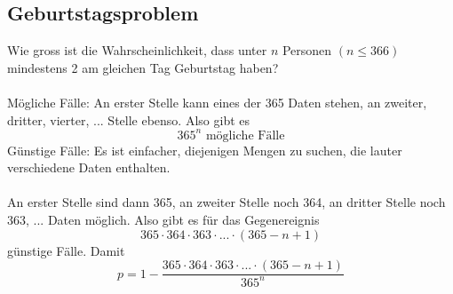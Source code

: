 \documentclass{report}
\begin{document}
\subsection{Geburtstagsproblem}
Wie gross ist die Wahrscheinlichkeit, dass unter $n$ Personen $(n \leq 366)$ mindestens 2 am gleichen Tag Geburtstag haben?\\\\
Mögliche Fälle: An erster Stelle kann eines der 365 Daten stehen, an zweiter, dritter, vierter, ... Stelle ebenso. Also gibt es
\begin{equation}
365^n \mbox{ mögliche Fälle}
\end{equation}
Günstige Fälle: Es ist einfacher, diejenigen Mengen zu suchen, die lauter verschiedene Daten enthalten.\\\\
An erster Stelle sind dann 365, an zweiter Stelle noch 364, an dritter Stelle noch 363, ... Daten möglich. Also gibt es für das Gegenereignis
\begin{equation}
365 \cdot 364 \cdot 363 \cdot ... \cdot (365-n+1)
\end{equation}
günstige Fälle. Damit
\begin{equation}
p = 1 - \frac{365 \cdot 364 \cdot 363 \cdot ... \cdot (365-n + 1)}{365^n}
\end{equation}
\end{document}
